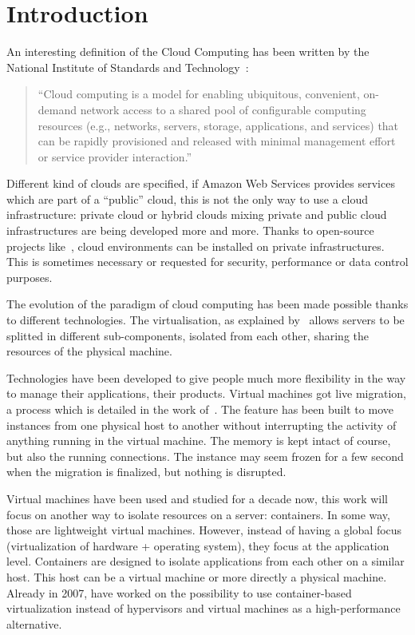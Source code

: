 \section*{Introduction}

An interesting definition of the Cloud Computing has
been written by the National Institute of Standards and Technology~\citep*{nistcloudcomputing}:

\begin{quote}
	“Cloud computing is a model for enabling ubiquitous, convenient, on-demand
	network access to a shared pool of configurable computing resources (e.g.,
	networks, servers, storage, applications, and services) that can be rapidly
	provisioned and released with minimal management effort or service provider
	interaction.”
\end{quote}

Different kind of clouds are specified, if Amazon Web Services provides
services which are part of a “public” cloud, this is not the only way to use a
cloud infrastructure: private cloud or hybrid clouds mixing private and public
cloud infrastructures are being developed more and more. Thanks to open-source
projects like~\cite{websiteOpenstack}, cloud environments can be installed on
private infrastructures. This is sometimes necessary or requested for security,
performance or data control purposes.

The evolution of the paradigm of cloud computing has been made possible thanks
to different technologies. The virtualisation, as explained
by~\cite*{virtualisation} allows servers to be splitted in different
sub-components, isolated from each other, sharing the resources of the physical
machine.

Technologies have been developed to give people much more flexibility in the
way to manage their applications, their products. Virtual machines got live
migration, a process which is detailed in the work of~\cite*{livemigration}.
The feature has been built to move instances from one physical host to another without
interrupting the activity of anything running in the virtual machine. The
memory is kept intact of course, but also the running connections. The instance
may seem frozen for a few second when the migration is finalized, but nothing
is disrupted.

Virtual machines have been used and studied for a decade now, this work will focus
on another way to isolate resources on a server: containers. In some way, those are
lightweight virtual machines. However, instead of having a global focus (virtualization
of hardware + operating system), they focus at the application level. Containers
are designed to isolate applications from each other on a similar host. This host
can be a virtual machine or more directly a physical machine. Already in 2007,
\cite{containersAsAlternative} have worked on the possibility to use container-based
virtualization instead of hypervisors and virtual machines as a high-performance
alternative.

